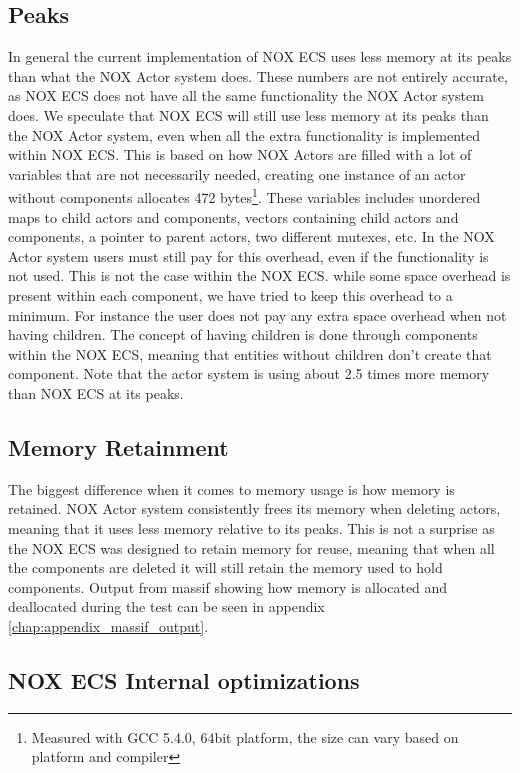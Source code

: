 \subsection{Peaks}
In general the current implementation of NOX ECS uses less memory at its peaks than what the NOX Actor system does.
These numbers are not entirely accurate, as NOX ECS does not have all the same functionality the NOX Actor system does.
We speculate that NOX ECS will still use less memory at its peaks than the NOX Actor system, even when
all the extra functionality is implemented within NOX ECS.
This is based on how NOX Actors are filled with a lot of variables that are not necessarily needed,
creating one instance of an actor without components allocates 472 bytes\footnote{Measured with GCC 5.4.0, 64bit platform, the size can vary based on platform and compiler}.
These variables includes unordered maps to child actors and components, vectors containing child actors and components,
a pointer to parent actors, two different mutexes, etc.
In the NOX Actor system users must still pay for this overhead, even if the functionality is not used.
This is not the case within the NOX ECS.
while some space overhead is present within each component, we have tried to keep this overhead to a minimum.
For instance the user does not pay any extra space overhead when not having children.
The concept of having children is done through components within the NOX ECS, meaning that entities without children
don't create that component.
Note that the actor system is using about 2.5 times more memory than NOX ECS at its peaks.

\subsection{Memory Retainment}
The biggest difference when it comes to memory usage is how memory is retained.
NOX Actor system consistently frees its memory when deleting actors, meaning that it uses less memory relative to its peaks.
This is not a surprise as the NOX ECS was designed to retain memory for reuse, meaning that when all the components are deleted
it will still retain the memory used to hold components.
Output from massif showing how memory is allocated and deallocated during the test can be seen in appendix \ref{chap:appendix_massif_output}.

\subsection{NOX ECS Internal optimizations}
